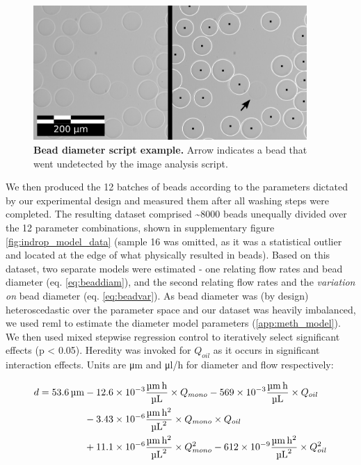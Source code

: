 \begin{figure}[ht]
\centerfloat
\includegraphics[width=103.91795mm]{./ims/indrop_algorithm.png}
\caption[Bead diameter script example]{\textbf{Bead diameter script example.} Arrow indicates a bead that went undetected by the image analysis script.}
 \label{fig:indrop_algorithm}
\end{figure}

We then produced the 12 batches of beads according to the parameters dictated by our experimental design and measured them after all washing steps were completed. The resulting dataset comprised \textasciitilde{}8000 beads unequally divided over the 12 parameter combinations, shown in supplementary figure \ref{fig:indrop_model_data} (sample 16 was omitted, as it was a statistical outlier and located at the edge of what physically resulted in beads). Based on this dataset, two separate models were estimated - one relating flow rates and bead diameter (eq. \ref{eq:beaddiam}), and the second relating flow rates and the \textit{variation on} bead diameter (eq. \ref{eq:beadvar}). As bead diameter was (by design) heteroscedastic over the parameter space and our dataset was heavily imbalanced, we used \acrfull{reml} to estimate the diameter model parameters (\ref{app:meth_model}). We then used mixed stepwise regression control to iteratively select significant effects (p < 0.05). Heredity was invoked for $Q_{oil}$ as it occurs in significant interaction effects. Units are \si{\micro\metre} and \si[per-mode=symbol]{\micro\litre\per\hour} for diameter and flow respectively:\pms

\begin{equation}
\label{eq:beaddiam}
	\begin{aligned}
	d = \SI{53.6}{\um} & - \num{12.6e-3} \SI[per-mode=fraction]{}{\um\hour\per\ul}\times Q_{mono} - \num{569e-3} \SI[per-mode=fraction]{}{\um\hour\per\ul}\times Q_{oil}\\
	& - \num{3.43e-6} \SI[per-mode=fraction]{}{\um\hour\squared\per\ul\squared}	\times Q_{mono}\times Q_{oil}\\
	& + \num{11.1e-6} \SI[per-mode=fraction]{}{\um\hour\squared\per\ul\squared}	\times Q_{mono}^{2} - \num{612e-9} \SI[per-mode=fraction]{}{\um\hour\squared\per\ul\squared} \times Q_{oil}^{2}
	\end{aligned}
\tagaddtext{[\si{\micro\metre}]}
\end{equation}

